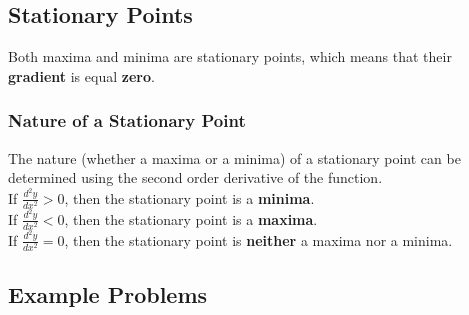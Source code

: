 \documentclass[hidelinks, a4paper, 12pt]{article}
\newcommand{\bd}{\textbf}
\newcommand{\n}{\\[\baselineskip]}
\begin{document}
        \subsection{Stationary Points}
            Both maxima and minima are stationary points, which means that their \bd{gradient} is equal \bd{zero}.
            \subsubsection{Nature of a Stationary Point}
                The nature (whether a maxima or a minima) of a stationary point can be determined using the second order derivative of the function.\n
                If $\frac{d^2y}{dx^2} > 0$, then the stationary point is a \bd{minima}.\n
                If $\frac{d^2y}{dx^2} < 0$, then the stationary point is a \bd{maxima}.\n
                If $\frac{d^2y}{dx^2} = 0$, then the stationary point is \bd{neither} a maxima nor a minima.
        
        \subsection{Example Problems}
\end{document}
